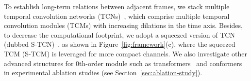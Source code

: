 \documentclass{article}
\begin{document}
To establish long-term relations between adjacent frames, we stack multiple temporal convolution networks (TCNs)~{\cite{luo2019conv}}, which comprise multiple temporal convolution modules (TCMs) with increasing dilations in the time axis. Besides, to decrease the computational footprint, we adopt a squeezed version of TCN (dubbed S-TCN)~{\cite{li2021two}}, as shown in Figure~{\ref{fig:framework}}(c), where the squeezed TCM (S-TCM) is leveraged for more compact channels. We also investigate other advanced structures for 0th-order module such as transformers~{\cite{vaswani2017attention}} and conformers~{\cite{gulati2020conformer}} in experimental ablation studies (see Section~{\ref{sec:ablation-study}).
}
\end{document}
